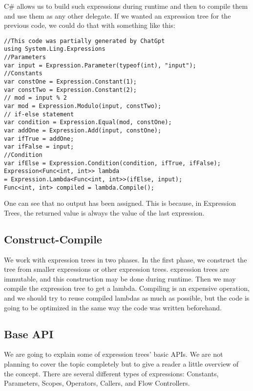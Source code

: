 C\# allows us to build such expressions during runtime and then to compile them and use them as any other delegate.
If we wanted an expression tree for the previous code, we could do that with something like this:

\begin{lstlisting}
//This code was partially generated by ChatGpt
using System.Ling.Expressions
//Parameters
var input = Expression.Parameter(typeof(int), "input");
//Constants
var constOne = Expression.Constant(1);
var constTwo = Expression.Constant(2);
// mod = input % 2 
var mod = Expression.Modulo(input, constTwo);
// if-else statement
var condition = Expression.Equal(mod, constOne);
var addOne = Expression.Add(input, constOne);
var ifTrue = addOne;
var ifFalse = input;
//Condition
var ifElse = Expression.Condition(condition, ifTrue, ifFalse);
Expression<Func<int, int>> lambda 
= Expression.Lambda<Func<int, int>>(ifElse, input);
Func<int, int> compiled = lambda.Compile();
\end{lstlisting}

One can see that no output has been assigned. This is because, in Expression Trees, the returned value is always the value of the last expression. 


\iffalse
\digraph{expressionTree1}{
  const_1 -> b0;
  input -> "+"
  const_1 -> "+"
  input -> "\%"
  "\%" -> "=="
  const_1 -> "=="
  "==" -> if [label = "check"]
  input -> if [label = "check is false"]
  "+" -> if [label = "check is true"]
}
\fi

\subsection{Construct-Compile}
We work with expression trees in two phases. In the first phase, we construct the tree from smaller expressions or other expression trees. expression trees are immutable, and this construction may be done during runtime. 
Then we may compile the expression tree to get a lambda. Compiling is an expensive operation, and we should try to reuse compiled lambdas as much as possible, but the code is going to be optimized in the same way the code was written beforehand. 

\subsection{Base API}
We are going to explain some of expression trees' basic APIs. We are not planning to cover the topic completely but to give a reader a little overview of the concept.
There are several different types of expressions: Constants, Parameters, Scopes, Operators, Callers, and Flow Controllers.

